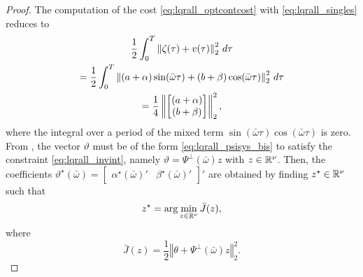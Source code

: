 \begin{proof}
	The computation of the cost \eqref{eq:lqrall_optcontcost} with \eqref{eq:lqrall_singles} reduces to
		\begin{multline}
      \label{eq:lqrall_staticcost}
			\frac{1}{2} \int_{0}^{T} \left\Vert \zeta(\tau) + v(\tau) \right\Vert^2_2\,d\tau\\
			=\frac{1}{2} \int_{0}^{T} \left\Vert (a+\alpha) \sin(\bar{\omega}\tau) + (b+\beta)\cos(\bar{\omega}\tau) \right\Vert^2_2\,d\tau\\
			=\frac{1}{4} \left\Vert\begin{bmatrix}
					(a+\alpha) \\
					(b+\beta)
      \end{bmatrix}\right\Vert^2_2,
		\end{multline}
	where the integral over a period of the mixed term $\sin(\bar{\omega}\tau)\cos(\bar{\omega}\tau)$ is zero. From , the vector $\vartheta$ must be of the form \eqref{eq:lqrall_psisys_bis} to satisfy the constraint \eqref{eq:lqrall_invint}, namely $\vartheta = \Psi^\perp(\bar{\omega})z$ with $z\in\mathbb{R}^\nu$. Then, the coefficients $\vartheta^{\star}(\bar{\omega})=\begin{bmatrix}\alpha^{\star}(\bar{\omega})' & \beta^{\star}(\bar{\omega})'\end{bmatrix}'$ are obtained by finding $z^{\star}\in\mathbb{R}^\nu$ such that
	\begin{equation}
		\label{eq:lqrall_finiteprb}
		z^{\star} = \arg\min_{z\in\mathbb{R}^\nu}\bar{J}(z),
	\end{equation}
	where
	\begin{equation}
		\label{eq:lqrall_finitecost}
		\bar{J}(z) = \frac{1}{2}\left\Vert \theta + \Psi^{\perp}(\bar{\omega})z \right\Vert^2_2.
	\end{equation}


\end{proof}
